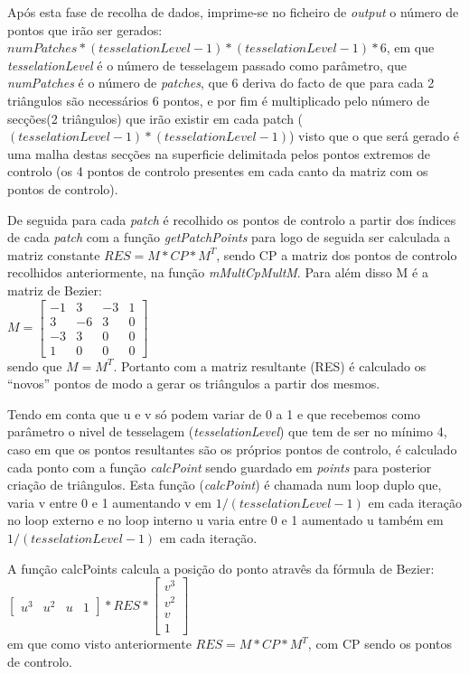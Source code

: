 \documentclass{article}
\begin{document}
Após esta fase de recolha de dados, imprime-se no ficheiro de \textit{output} o número de pontos que irão ser gerados: $numPatches*(tesselationLevel-1)*(tesselationLevel-1)*6$, em que \textit{tesselationLevel} é o número de tesselagem passado como parâmetro, que \textit{numPatches} é o número de \textit{patches}, que 6 deriva do facto de que para cada 2 triângulos são necessários 6 pontos, e por fim é multiplicado pelo número de secções(2 triângulos) que irão existir em cada patch ($(tesselationLevel-1)*(tesselationLevel-1)$) visto que o que será gerado é uma malha destas secções na superficie delimitada pelos pontos extremos de controlo (os 4 pontos de controlo presentes em cada canto da matriz com os pontos de controlo).

De seguida para cada \textit{patch} é recolhido os pontos de controlo a partir dos índices de cada \textit{patch} com a função \textit{getPatchPoints} para logo de seguida ser calculada a matriz constante $RES=M*CP*M^T$, sendo CP a matriz dos pontos de controlo recolhidos anteriormente, na função \textit{mMultCpMultM}. Para além disso M é a matriz de Bezier:\\
$M=\begin{bmatrix} 
-1 & 3 & -3 & 1 \\
3 & -6 & 3 & 0 \\
-3 & 3 & 0 & 0 \\
1 & 0 & 0 & 0
\end{bmatrix}$\\
sendo que $M=M^T$. Portanto com a matriz resultante (RES) é calculado os ``novos'' pontos de modo a gerar os triângulos a partir dos mesmos. 

Tendo em conta que u e v só podem variar de 0 a 1 e que recebemos como parâmetro o nivel de tesselagem (\textit{tesselationLevel}) que tem de ser no mínimo 4, caso em que os pontos resultantes são os próprios pontos de controlo, é calculado cada ponto com a função \textit{calcPoint} sendo guardado em \textit{points} para posterior criação de triângulos. Esta função (\textit{calcPoint}) é chamada num loop duplo que, varia v entre 0 e 1 aumentando v em $1/(tesselationLevel-1)$ em cada iteração no loop externo e no loop interno u varia entre 0 e 1 aumentado u também em $1/(tesselationLevel-1)$ em cada iteração. 

A função calcPoints calcula a posição do ponto atravês da fórmula de Bezier:\\
$\begin{bmatrix} u^3 & u^2 & u & 1 \end{bmatrix}*RES*\begin{bmatrix} v^3 \\ v^2 \\ v \\ 1 \end{bmatrix}$\\
em que como visto anteriormente $RES=M*CP*M^T$, com CP sendo os pontos de controlo.
\end{document}
